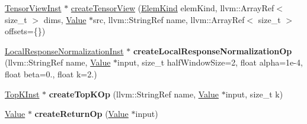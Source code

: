 \begin{Indent}
\begin{DoxyCompactItemize}
\item 
\hyperlink{classglow_1_1_tensor_view_inst}{Tensor\+View\+Inst} $\ast$ \hyperlink{classglow_1_1_i_r_builder_a20f136fcda917bfe15800467a9ef94dc}{create\+Tensor\+View} (\hyperlink{namespaceglow_ab92e14a94329daf4083db670e95fbcdf}{Elem\+Kind} elem\+Kind, llvm\+::\+Array\+Ref$<$ size\+\_\+t $>$ dims, \hyperlink{classglow_1_1_value}{Value} $\ast$src, llvm\+::\+String\+Ref name, llvm\+::\+Array\+Ref$<$ size\+\_\+t $>$ offsets=\{\})
\item 
\mbox{\label{classglow_1_1_i_r_builder_a67b7c66b1f2747cd2884dc119d8312c1}} 
\hyperlink{classglow_1_1_local_response_normalization_inst}{Local\+Response\+Normalization\+Inst} $\ast$ {\bfseries create\+Local\+Response\+Normalization\+Op} (llvm\+::\+String\+Ref name, \hyperlink{classglow_1_1_value}{Value} $\ast$input, size\+\_\+t half\+Window\+Size=2, float alpha=1e-\/4, float beta=0., float k=2.)
\item 
\mbox{\label{classglow_1_1_i_r_builder_a9f7a588a3961723fb5517e10e3a415a2}} 
\hyperlink{classglow_1_1_top_k_inst}{Top\+K\+Inst} $\ast$ {\bfseries create\+Top\+K\+Op} (llvm\+::\+String\+Ref name, \hyperlink{classglow_1_1_value}{Value} $\ast$input, size\+\_\+t k)
\item 
\mbox{\label{classglow_1_1_i_r_builder_a31c08879fb0553e907ea0c309d944e54}} 
\hyperlink{classglow_1_1_value}{Value} $\ast$ {\bfseries create\+Return\+Op} (\hyperlink{classglow_1_1_value}{Value} $\ast$input)
\end{DoxyCompactItemize}
\end{Indent}
